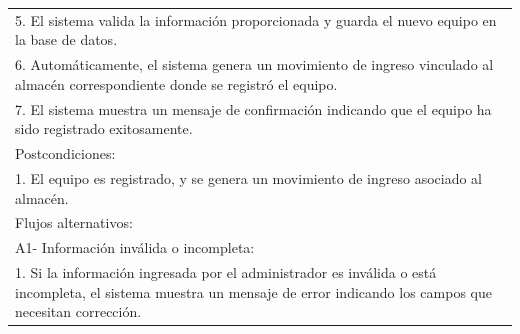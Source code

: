 \documentclass[stu, 12pt, letterpaper, donotrepeattitle, floatsintext, natbib]{apa7}
\begin{document}
\begin{longtable}{@{} p{16.5cm} @{}}
    5. El sistema valida la informaci\'on proporcionada y guarda el nuevo equipo en la base de datos.                                                                                                                                                                                          \\
    6. Autom\'aticamente, el sistema genera un movimiento de ingreso vinculado al almac\'en correspondiente donde se registr\'o el equipo.                                                                                                                                                     \\
    7. El sistema muestra un mensaje de confirmaci\'on indicando que el equipo ha sido registrado exitosamente.                                                                                                                                                                                \\ \midrule
    Postcondiciones:                                                                                                                                                                                                                                                                           \\
    1. El equipo es registrado, y se genera un movimiento de ingreso asociado al almac\'en.                                                                                                                                                                                                    \\ \midrule
    Flujos alternativos:                                                                                                                                                                                                                                                                       \\
    A1- Informaci\'on inv\'alida o incompleta:                                                                                                                                                                                                                                                 \\
    \hspace{1cm}1. Si la informaci\'on ingresada por el administrador es inv\'alida o est\'a incompleta, el sistema muestra un mensaje de error indicando los campos que necesitan correcci\'on.                                                                                               \\

\end{longtable}
\end{document}
